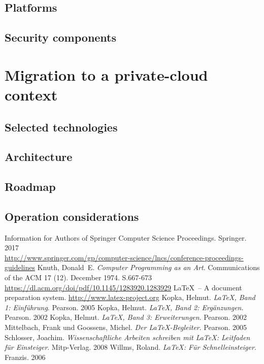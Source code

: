 \documentclass{llncs}
\begin{document}
\subsection{Platforms}

\subsection{Security components}


\section{Migration to a private-cloud context}

\subsection{Selected technologies}

\subsection{Architecture}

\subsection{Roadmap}

\subsection{Operation considerations}


\begin{thebibliography}{5}
  
  Information for Authors of Springer Computer Science Proceedings. Springer. 2017\\
  \url{http://www.springer.com/gp/computer-science/lncs/conference-proceedings-guidelines}
  Knuth, Donald~E. \textsl{Computer Programming as an Art}. Communications of the ACM 17 (12). December 1974. S.667-673\\
  \url{https://dl.acm.org/doi/pdf/10.1145/1283920.1283929}
  \LaTeX\ -- A document preparation system.
  \url{http://www.latex-project.org}
  Kopka, Helmut. \textsl{\LaTeX, Band 1: Einführung}. Pearson. 2005
  Kopka, Helmut. \textsl{\LaTeX, Band 2: Ergänzungen}. Pearson. 2002
  Kopka, Helmut. \textsl{\LaTeX, Band 3: Erweiterungen}. Pearson. 2002
  Mittelbach, Frank und Goossens, Michel. \textsl{Der LaTeX-Begleiter}. Pearson. 2005
  Schlosser, Joachim. \textsl{Wissenschaftliche Arbeiten schreiben mit LaTeX: Leitfaden für Einsteiger}. Mitp-Verlag. 2008
  Willms, Roland. \textsl{\LaTeX: Für Schnelleinsteiger}. Franzis. 2006
\end{thebibliography}
\end{document}
